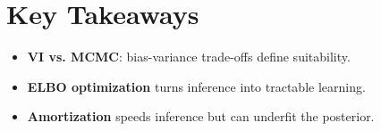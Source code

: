 
\section*{Key Takeaways}

\begin{itemize}[leftmargin=2em]
    \item \textbf{VI vs. MCMC}: bias-variance trade-offs define suitability.
    \item \textbf{ELBO optimization} turns inference into tractable learning.
    \item \textbf{Amortization} speeds inference but can underfit the posterior.
\end{itemize}


